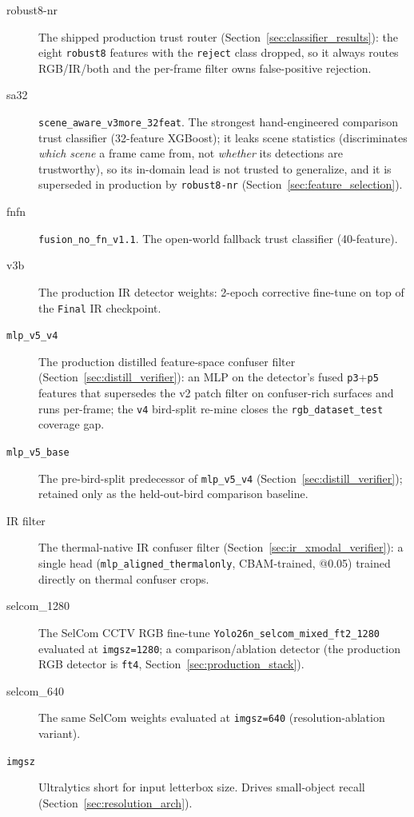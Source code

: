 \begin{description}
    \item[robust8-nr] The shipped production trust router (Section~\ref{sec:classifier_results}): the eight \texttt{robust8} features with the \texttt{reject} class dropped, so it always routes RGB/IR/both and the per-frame filter owns false-positive rejection.
    \item[sa32] \texttt{scene\_aware\_\allowbreak v3more\_\allowbreak 32feat}. The strongest hand-engineered comparison trust classifier (32-feature XGBoost); it leaks scene statistics (discriminates \emph{which scene} a frame came from, not \emph{whether} its detections are trustworthy), so its in-domain lead is not trusted to generalize, and it is superseded in production by \texttt{robust8-nr} (Section~\ref{sec:feature_selection}).
    \item[fnfn] \texttt{fusion\_no\_fn\_v1.1}. The open-world fallback trust classifier (40-feature).
    \item[v3b] The production IR detector weights: 2-epoch corrective fine-tune on top of the \texttt{Final} IR checkpoint.
    \item[\texttt{mlp\_v5\_v4}] The production distilled feature-space confuser filter (Section~\ref{sec:distill_verifier}): an MLP on the detector's fused \texttt{p3}+\texttt{p5} features that supersedes the v2 patch filter on confuser-rich surfaces and runs per-frame; the \texttt{v4} bird-split re-mine closes the \texttt{rgb\_dataset\_test} coverage gap.
    \item[\texttt{mlp\_v5\_base}] The pre-bird-split predecessor of \texttt{mlp\_v5\_v4} (Section~\ref{sec:distill_verifier}); retained only as the held-out-bird comparison baseline.
    \item[IR filter] The thermal-native IR confuser filter (Section~\ref{sec:ir_xmodal_verifier}): a single head (\texttt{mlp\_aligned\_thermalonly}, CBAM-trained, @0.05) trained directly on thermal confuser crops.
    \item[selcom\_1280] The SelCom CCTV RGB fine-tune \texttt{Yolo26n\_\allowbreak selcom\_\allowbreak mixed\_\allowbreak ft2\_1280} evaluated at \texttt{imgsz=1280}; a comparison/ablation detector (the production RGB detector is \texttt{ft4}, Section~\ref{sec:production_stack}).
    \item[selcom\_640] The same SelCom weights evaluated at \texttt{imgsz=640} (resolution-ablation variant).
    \item[\texttt{imgsz}] Ultralytics short for input letterbox size. Drives small-object recall (Section~\ref{sec:resolution_arch}).
\end{description}

